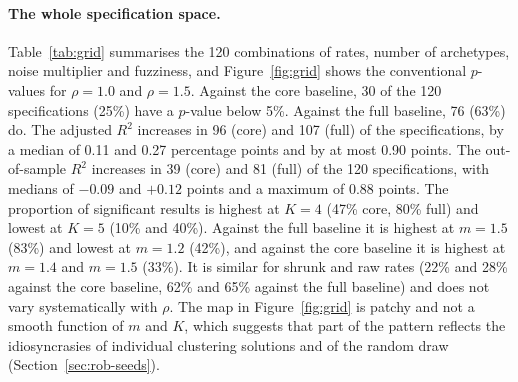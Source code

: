 \paragraph{The whole specification space.} Table~\ref{tab:grid} summarises the 120 combinations of rates, number of archetypes, noise multiplier and fuzziness, and Figure~\ref{fig:grid} shows the conventional $p$-values for $\rho=1.0$ and $\rho=1.5$. Against the core baseline, 30 of the 120 specifications (25\%) have a $p$-value below 5\%. Against the full baseline, 76 (63\%) do. The adjusted $R^2$ increases in 96 (core) and 107 (full) of the specifications, by a median of 0.11 and 0.27 percentage points and by at most 0.90 points. The out-of-sample $R^2$ increases in 39 (core) and 81 (full) of the 120 specifications, with medians of $-0.09$ and $+0.12$ points and a maximum of 0.88 points. The proportion of significant results is highest at $K=4$ (47\% core, 80\% full) and lowest at $K=5$ (10\% and 40\%). Against the full baseline it is highest at $m=1.5$ (83\%) and lowest at $m=1.2$ (42\%), and against the core baseline it is highest at $m=1.4$ and $m=1.5$ (33\%). It is similar for shrunk and raw rates (22\% and 28\% against the core baseline, 62\% and 65\% against the full baseline) and does not vary systematically with $\rho$. The map in Figure~\ref{fig:grid} is patchy and not a smooth function of $m$ and $K$, which suggests that part of the pattern reflects the idiosyncrasies of individual clustering solutions and of the random draw (Section~\ref{sec:rob-seeds}).

